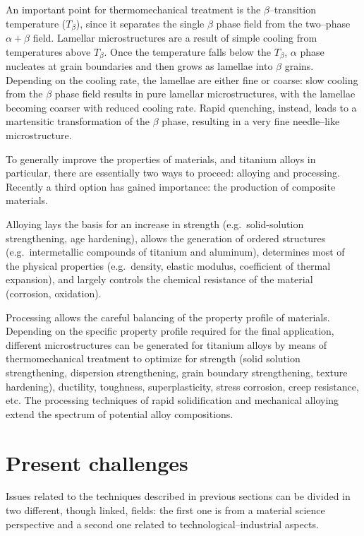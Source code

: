 An important point for thermomechanical treatment is the $\beta$--transition temperature ($T_\beta$), since it separates the single $\beta$ phase field from the two--phase $\alpha+\beta$ field. Lamellar microstructures are a result of simple cooling from temperatures above $T_\beta$. Once the temperature falls below the $T_\beta$, $\alpha$ phase nucleates at grain boundaries and then grows as lamellae into $\beta$ grains.
Depending on the cooling rate, the lamellae are either fine or coarse: slow cooling from the $\beta$ phase field results in pure lamellar microstructures, with the lamellae becoming coarser with reduced cooling rate. Rapid quenching, instead, leads to a martensitic transformation of the $\beta$ phase, resulting in a very fine needle--like microstructure.

To generally improve the properties of materials, and titanium alloys in particular, there are essentially two ways to proceed: alloying and processing. Recently a third option has gained importance: the production of composite materials. %

Alloying lays the basis for an increase in strength (e.g.\ solid-solution strengthening, age hardening), allows the generation of ordered structures (e.g.\ intermetallic compounds of titanium and aluminum), determines most of the physical properties (e.g.\ density, elastic modulus, coefficient of thermal expansion), and largely controls the chemical resistance of the material (corrosion, oxidation).

Processing allows the careful balancing of the property profile of materials. Depending on the specific property profile required for the final application, different microstructures can be generated for titanium alloys by means of thermomechanical treatment to optimize for strength (solid solution strengthening, dispersion strengthening, grain boundary strengthening, texture hardening), ductility, toughness, superplasticity, stress corrosion, creep resistance, etc. The processing techniques of rapid solidification and mechanical alloying extend the spectrum of potential alloy compositions.















\section{Present challenges}
\label{sec:challenges}
Issues related to the techniques described in previous sections can be divided in two different, though linked, fields: the first one is from a material science perspective and a second one related to technological--industrial aspects.

